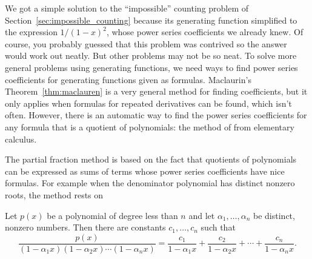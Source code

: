 We got a simple solution to the ``impossible'' counting problem of
Section~\ref{sec:impossible_counting} because its generating function
simplified to the expression $1/(1-x)^2$, whose power series
coefficients we already knew.  Of course, you probably guessed that
this problem was contrived so the answer would work out neatly.  But
other problems may not be so neat.  To solve more general problems
using generating functions, we need ways to find power series
coefficients for generating functions given as formulas.  Maclaurin's
Theorem~\ref{thm:maclauren} is a very general method for finding
coefficients, but it only applies when formulas for repeated
derivatives can be found, which isn't often.  However, there is an
automatic way to find the power series coefficients for any formula
that is a quotient of polynomials: the method of  from elementary calculus.

The partial fraction method is based on the fact that quotients of
polynomials can be expressed as sums of terms whose power series
coefficients have nice formulas.  For example when the denominator
polynomial has distinct nonzero roots, the method rests on
\begin{lemma}\label{lem:partial-fraction-distinct-roots}
  Let $p(x)$ be a polynomial of degree less than $n$ and let
  $\alpha_1, \dots, \alpha_n$ be distinct, nonzero numbers.  Then
  there are constants $c_1,\dots,c_n$ such that
\[
\frac{p(x)}{(1-\alpha_1 x)(1-\alpha_2 x)\cdots(1-\alpha_n x)} =
\frac{c_1}{1-\alpha_1 x} + \frac{c_2}{1-\alpha_2 x} + \cdots +
\frac{c_n}{1-\alpha_n x}.
\]
\end{lemma}

